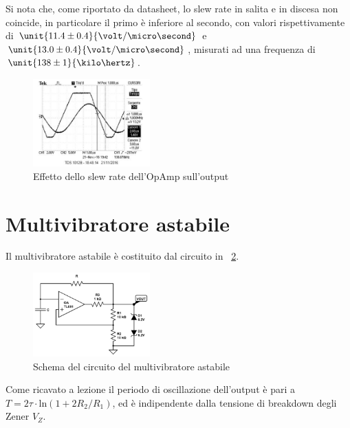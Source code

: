 \documentclass[10pt,a4paper]{article}
\begin{document}
Si nota che, come riportato da datasheet, lo slew rate in salita e in discesa non coincide, in particolare il primo è inferiore al secondo, con valori rispettivamente di $\unit{11.4 \pm 0.4}{\volt/\micro\second}$ e $\unit{13.0 \pm 0.4}{\volt/\micro\second}$, misurati ad una frequenza di $\unit{138 \pm 1}{\kilo\hertz}$.

\begin{figure}[H]
	\centering
	\includegraphics[width=0.40\textwidth]{../oscilloscopio/schmitt_slewrate.jpg}
	\caption{Effetto dello slew rate dell'OpAmp sull'output}
	\label{fig:slew_rate}
\end{figure}



\section{Multivibratore astabile}
Il multivibratore astabile è costituito dal circuito in \figurename{~\ref{fig:multivibratore}}.

\begin{figure}[H]
	\centering
	\includegraphics[width=0.40\textwidth]{../circuiti/multivibratore.jpg}
	\caption{Schema del circuito del multivibratore astabile}
	\label{fig:multivibratore}
\end{figure}

Come ricavato a lezione il periodo di oscillazione dell'output è pari a $T = 2 \tau \cdot \text{ln}(1 + 2 R_2/R_1)$, ed è indipendente dalla tensione di breakdown degli Zener $V_Z$.
\end{document}
